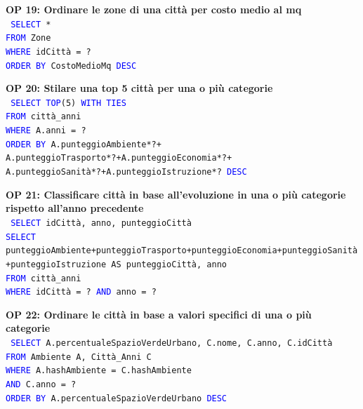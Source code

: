 \documentclass[a4paper,12pt]{report}
\begin{document}
            \noindent
            \textbf{OP 19: Ordinare le zone di una città per costo medio al mq} \\
            \texttt{
                \textcolor{blue}{SELECT} * \\
                \textcolor{blue}{FROM} Zone \\
                \textcolor{blue}{WHERE} idCittà = ? \\
                \textcolor{blue}{ORDER BY} CostoMedioMq \textcolor{blue}{DESC} \\
            }

            \noindent
            \textbf{OP 20: Stilare una top 5 città per una o più categorie} \\
            \texttt{
                \textcolor{blue}{SELECT TOP}(5) \textcolor{blue}{WITH TIES} \\
                \textcolor{blue}{FROM} città\_anni \\
                \textcolor{blue}{WHERE} A.anni = ? \\
                \textcolor{blue}{ORDER BY} A.punteggioAmbiente*?+ \\
                A.punteggioTrasporto*?+A.punteggioEconomia*?+ \\
                A.punteggioSanità*?+A.punteggioIstruzione*? \textcolor{blue}{DESC} \\
            }
            
            \noindent
            \textbf{OP 21: Classificare città in base all’evoluzione in una o più categorie rispetto all’anno precedente} \\
            \texttt{
                \textcolor{blue}{SELECT} idCittà, anno, punteggioCittà \\
                \textcolor{blue}{SELECT} punteggioAmbiente+punteggioTrasporto+punteggioEconomia+punteggioSanità+punteggioIstruzione AS punteggioCittà, anno \\
                \textcolor{blue}{FROM} città\_anni \\
                \textcolor{blue}{WHERE} idCittà = ? \textcolor{blue}{AND} anno = ? \\
            }
            
            \noindent
            \textbf{OP 22: Ordinare le città in base a valori specifici di una o più categorie} \\
            \texttt{
                \textcolor{blue}{SELECT} A.percentualeSpazioVerdeUrbano, C.nome, C.anno, C.idCittà \\
                \textcolor{blue}{FROM} Ambiente A, Città\_Anni C \\
                \textcolor{blue}{WHERE} A.hashAmbiente = C.hashAmbiente  \\
                \textcolor{blue}{AND} C.anno = ? \\
                \textcolor{blue}{ORDER BY} A.percentualeSpazioVerdeUrbano \textcolor{blue}{DESC} \\
            }
            
\end{document}
